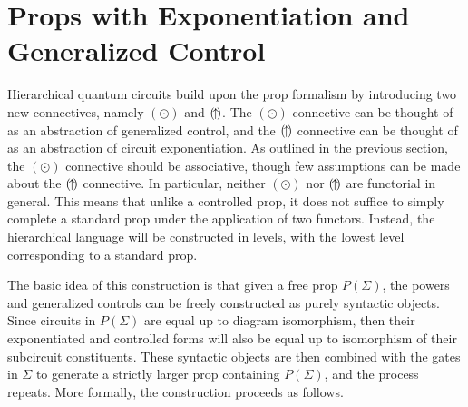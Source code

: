 \section{Props with Exponentiation and Generalized Control}
%
\label{Sect:Hierarchical}

Hierarchical quantum circuits build upon the prop formalism by introducing two new connectives, namely $( \odot )$ and $( \!\uparrow\! )$.
The $( \odot )$ connective can be thought of as an abstraction of generalized control, and the $( \!\uparrow\! )$ connective can be thought of as an abstraction of circuit exponentiation.
As outlined in the previous section, the $( \odot )$ connective should be associative, though few assumptions can be made about the $( \!\uparrow\! )$ connective.
In particular, neither $( \odot )$ nor $( \!\uparrow\! )$ are functorial in general.
This means that unlike a controlled prop, it does not suffice to simply complete a standard prop under the application of two functors.
Instead, the hierarchical language will be constructed in levels, with the lowest level corresponding to a standard prop.

The basic idea of this construction is that given a free prop $P( \Sigma )$, the powers and generalized controls can be freely constructed as purely syntactic objects.
Since circuits in $P( \Sigma )$ are equal up to diagram isomorphism, then their exponentiated and controlled forms will also be equal up to isomorphism of their subcircuit constituents.
These syntactic objects are then combined with the gates in $\Sigma$ to generate a strictly larger prop containing $P( \Sigma )$, and the process repeats.
More formally, the construction proceeds as follows.


